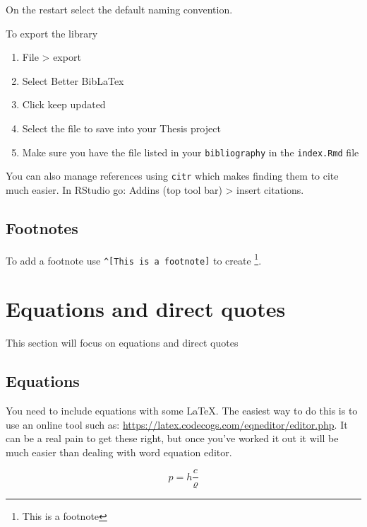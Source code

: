 \documentclass[
  12pt,
  oneside]{book}
\begin{document}
On the restart select the default naming convention.

To export the library

\begin{enumerate}
\def\labelenumi{\arabic{enumi}.}
\item
  File \textgreater{} export
\item
  Select Better BibLaTex
\item
  Click keep updated
\item
  Select the file to save into your Thesis project
\item
  Make sure you have the file listed in your \texttt{bibliography} in the \texttt{index.Rmd} file
\end{enumerate}

You can also manage references using \texttt{citr} which makes finding them to cite much easier. In RStudio go: Addins (top tool bar) \textgreater{} insert citations.

\hypertarget{footnotes}{%
\section{Footnotes}\label{footnotes}}

To add a footnote use \texttt{\^{}{[}This\ is\ a\ footnote{]}} to create \footnote{This is a footnote}.

\hypertarget{equations-and-direct-quotes}{%
\chapter{Equations and direct quotes}\label{equations-and-direct-quotes}}

This section will focus on equations and direct quotes

\hypertarget{equations}{%
\section{Equations}\label{equations}}

You need to include equations with some LaTeX. The easiest way to do this is to use an online tool such as: \url{https://latex.codecogs.com/eqneditor/editor.php}. It can be a real pain to get these right, but once you've worked it out it will be much easier than dealing with word equation editor.

\begin{equation} 
  p= h\frac{c}{\varrho}
  \label{eq:test}
\end{equation}
\end{document}
